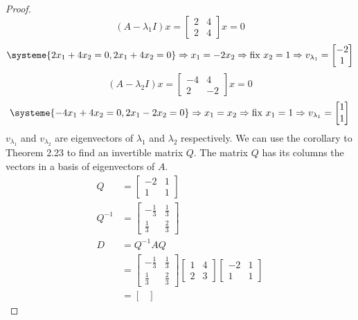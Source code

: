 \documentclass[11pt]{scrartcl}
\begin{document}
\begin{proof}
	\[
		(A - \lambda_1I)x =  \begin{bmatrix}2 & 4 \\ 2 & 4\end{bmatrix}x = 0
	\]
	\[
		\systeme{
			2x_1 + 4x_2 = 0,
			2x_1 + 4x_2 = 0
		}
		\Rightarrow x_1 = -2x_2
		\Rightarrow \text{fix } x_2 = 1
		\Rightarrow v_{\lambda_1} =  \begin{bmatrix}-2 \\1 \end{bmatrix}
	\]
	\[
		(A - \lambda_2I)x = \begin{bmatrix}-4 & 4 \\ 2 & -2  \end{bmatrix}x = 0
	\]
	\[
		\systeme{
			-4x_1 + 4x_2 = 0,
			2x_1 - 2x_2 = 0
		}
		\Rightarrow x_1 = x_2
		\Rightarrow \text{fix } x_1 = 1
		\Rightarrow v_{\lambda_1} =  \begin{bmatrix}1 \\1  \end{bmatrix}
	\]
	$v_{\lambda_1}$ and $v_{\lambda_2}$ are eigenvectors of $\lambda_1$ and $\lambda_2$ respectively.
	We can use the corollary to Theorem 2.23 to find an invertible matrix $Q$.
	The matrix $Q$ has its columns the vectors in a basis of eigenvectors of $A$.
	\begin{align*}
		Q      & =
		\begin{bmatrix}
			-2 & 1 \\
			1  & 1
		\end{bmatrix}            \\
		Q^{-1} & = \begin{bmatrix}-\frac{1}{3}&\frac{1}{3}\\ \frac{1}{3}&\frac{2}{3}\end{bmatrix} \\
		D      & = Q^{-1} A Q                 \\
		       & =
		\begin{bmatrix}-\frac{1}{3}&\frac{1}{3}\\ \frac{1}{3}&\frac{2}{3}\end{bmatrix}
		\begin{bmatrix}
			1 & 4 \\ 2 & 3
		\end{bmatrix}
		\begin{bmatrix}
			-2 & 1 \\
			1  & 1
		\end{bmatrix}            \\
		       & =
		\begin{bmatrix}

\end{bmatrix}
\end{align*}
\end{proof}
\end{document}
